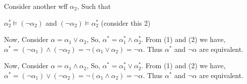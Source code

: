 \documentclass[12pt,letterpaper]{article}
\begin{document}
\begin{enumerate}
  Consider another wff $\alpha_{2}$, Such that 
  
  $\alpha_{2}^*\models (\neg\alpha_{2})$ and $(\neg\alpha_{2})\models\alpha_{2}^*$  (consider this 2)
  
  Now, Consider $\alpha = \alpha_{1} \lor \alpha_{2}$, So, $\alpha^{*} = \alpha_{1}^{*} \land \alpha_{2}^{*}$. From (1) and (2) we have, $\alpha^{*} = (\neg\alpha_{1}) \land (\neg\alpha_{2}) = \neg( \alpha_{1} \lor \alpha_{2}) = \neg\alpha$. Thus $\alpha^{*}$ and $\lnot \alpha$ are equivalent.
  
   Now, Consider $\alpha = \alpha_{1} \land \alpha_{2}$, So, $\alpha^{*} = \alpha_{1}^{*} \lor \alpha_{2}^{*}$. From (1) and (2) we have, $\alpha^{*} = (\neg\alpha_{1}) \lor (\neg\alpha_{2}) = \neg( \alpha_{1} \land \alpha_{2}) = \neg\alpha$. Thus $\alpha^{*}$ and $\lnot \alpha$ are equivalent.
\end{enumerate}
\end{document}
